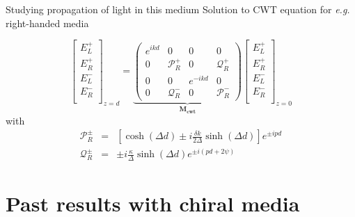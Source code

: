 \documentclass[aspectratio=169]{beamer}
\begin{document}
\begin{frame}{Studying propagation of light in this medium}
Solution to CWT equation for \textit{e.g.} right-handed media

\begin{equation*}
\begin{bmatrix}
E_L^+ \\
E_R^+ \\
E_L^- \\
E_R^- \\
\end{bmatrix}_{z=d} = \underbrace{\begin{pmatrix}
	e^{ikd} & 0 & 0 & 0 \\
	0 & \mathcal{P}_R^+ & 0 & \mathcal{Q}_R^+ \\
	0 & 0 & e^{-ikd} & 0 \\
	0 & \mathcal{Q}_R^- & 0 & \mathcal{P}_R^-
	\end{pmatrix}}_{\bm{M_{cwt}}}\begin{bmatrix}
E_L^+ \\
E_R^+ \\
E_L^- \\
E_R^- \\
\end{bmatrix}_{z=0}
\end{equation*}
with
\begin{eqnarray*}
\mathcal{P}_R^\pm &=& \left[\cosh(\Delta d) \pm i \frac{\delta k}{2\Delta}\sinh(\Delta d)\right]e^{\pm ipd}\\
\mathcal{Q}_R^\pm &=& \pm i\frac{\kappa}{\Delta}\sinh(\Delta d) e^{\pm i(pd+2\psi)}
\end{eqnarray*}

\end{frame}

\section{Past results with chiral media}
\end{document}
